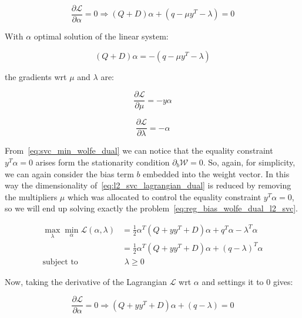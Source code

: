 \begin{equation} \label{eq:l2_svc_lagrangian_der_a}
	\frac{\partial \mathcal{L}}{\partial \alpha}=0\Rightarrow (Q+D) \alpha + (q - \mu y^T - \lambda) = 0
\end{equation}

With $\alpha$ optimal solution of the linear system:

\begin{equation} \label{eq:l2_svc_lagrangian_sol}
    (Q+D) \alpha = - (q - \mu y^T - \lambda)
\end{equation}

the gradients wrt $\mu$ and $\lambda$ are:

\begin{equation} \label{eq:l2_svc_lagrangian_der_mu}
	\frac{\partial \mathcal{L}}{\partial \mu}=-y \alpha
\end{equation}

\begin{equation} \label{eq:l2_svc_lagrangian_der_lambda}
    \frac{\partial \mathcal{L}}{\partial \lambda}=-\alpha
\end{equation}

From~\eqref{eq:svc_min_wolfe_dual} we can notice that the equality constraint $y^T \alpha = 0$ arises form the stationarity condition $\partial_{{b}} \mathcal{W}=0$. So, again, for simplicity, we can again consider the bias term $b$ embedded into the weight vector. In this way the dimensionality of~\eqref{eq:l2_svc_lagrangian_dual} is reduced by removing the multipliers $\mu$ which was allocated to control the equality constraint $y^T \alpha=0$, so we will end up solving exactly the problem~\eqref{eq:reg_bias_wolfe_dual_l2_svc}.

\begin{equation} \label{eq:l2_svc_lb_lagrangian_dual}
	\begin{aligned}
    	\max_{\lambda} \min_{\alpha} \mathcal{L}(\alpha,\lambda) &= \frac{1}{2} \alpha^T (Q + yy^T + D) \alpha+q^T\alpha - \lambda^T \alpha \\
    &= \frac{1}{2} \alpha^T (Q + yy^T + D) \alpha + (q - \lambda)^T \alpha \\
    \text{subject to} \quad & \,\, \lambda \geq 0
	\end{aligned}
\end{equation}

Now, taking the derivative of the Lagrangian $\mathcal{L}$ wrt $\alpha$ and settings it to 0 gives:

\begin{equation} \label{eq:l2_svc_lb_lagrangian_der_a}
	\frac{\partial \mathcal{L}}{\partial \alpha}=0\Rightarrow (Q + yy^T + D) \alpha + (q - \lambda) = 0
\end{equation}

